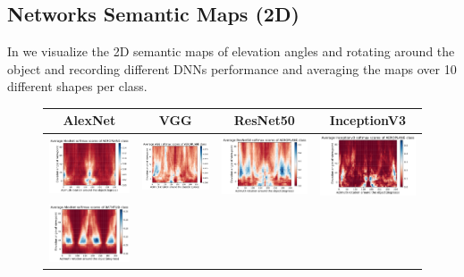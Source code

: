 \subsection{Networks Semantic Maps (2D)}
In \figLabel{\ref{fig:nsm2d-1},\ref{fig:nsm2d-2}} we visualize the 2D semantic maps of elevation angles and rotating around the object and recording different DNNs performance and averaging the maps over 10 different shapes per class.
\begin{figure}[h]
\centering
\tabcolsep=0.03cm
   \begin{tabular}{||c|c|c|c||} \hline
   \textbf{AlexNet} & \textbf{VGG} &\textbf{ResNet50} & \textbf{InceptionV3} \\ \hline
\includegraphics[width = 4cm]{supimages/nms2d/AlexNet_aeroplane_Average.pdf}&
\includegraphics[width = 4cm]{supimages/nms2d/VGG_aeroplane_Average.pdf}&
\includegraphics[width = 4cm]{supimages/nms2d/ResNet50_aeroplane_Average.pdf}&
\includegraphics[width = 4cm]{supimages/nms2d/Inceptionv3_aeroplane_Average.pdf}\\ \hline
\includegraphics[width = 4cm]{supimages/nms2d/AlexNet_bathtub_Average.pdf}&

\end{tabular}
\end{figure}
